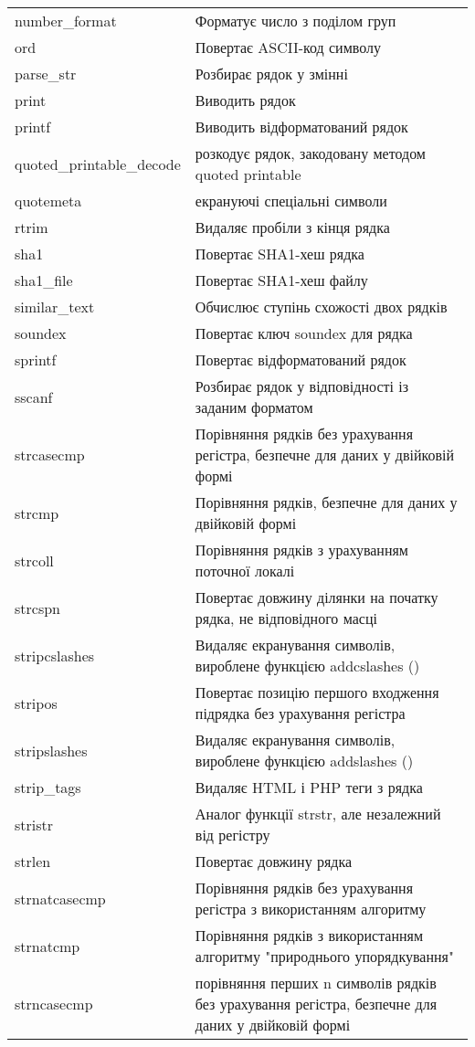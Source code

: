 \begin{longtable}[t]{|l|p{21em}|}
number\_format & Форматує число з поділом груп \\
ord & Повертає ASCII-код символу \\
parse\_str & Розбирає рядок у змінні \\
print & Виводить рядок \\
printf & Виводить відформатований рядок \\
quoted\_printable\_decode & розкодує рядок, закодовану методом quoted printable \\
quotemeta & екрануючі спеціальні символи \\
rtrim & Видаляє пробіли з кінця рядка \\
sha1 & Повертає SHA1-хеш рядка \\
sha1\_file & Повертає SHA1-хеш файлу \\
similar\_text & Обчислює ступінь схожості двох рядків \\
soundex & Повертає ключ soundex для рядка \\
sprintf & Повертає відформатований рядок \\
sscanf & Розбирає рядок у відповідності із заданим форматом \\
strcasecmp & Порівняння рядків без урахування регістра, безпечне для даних у двійковій формі \\
strcmp & Порівняння рядків, безпечне для даних у двійковій формі \\
strcoll & Порівняння рядків з урахуванням поточної локалі \\
strcspn & Повертає довжину ділянки на початку рядка, не відповідного  масці \\
stripcslashes & Видаляє екранування символів, вироблене функцією addcslashes () \\
stripos & Повертає позицію першого входження підрядка без урахування регістра \\
stripslashes & Видаляє екранування символів, вироблене функцією addslashes () \\
strip\_tags & Видаляє HTML і PHP теги з рядка \\
stristr & Аналог функції strstr, але незалежний від регістру \\
strlen & Повертає довжину рядка \\
strnatcasecmp & Порівняння рядків без урахування регістра з використанням алгоритму \\
strnatcmp & Порівняння рядків з використанням алгоритму "природнього упорядкування" \\
strncasecmp & порівняння перших n символів рядків без урахування регістра, безпечне для даних у двійковій формі \\

\end{longtable}
